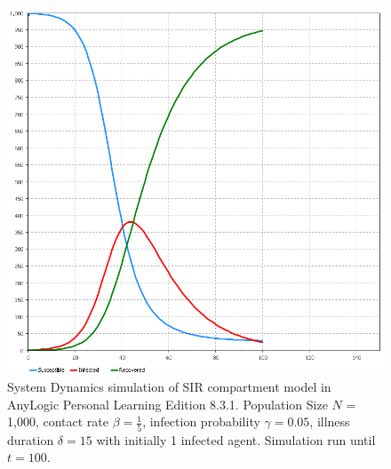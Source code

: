 \begin{figure}
	\centering
	\includegraphics[width=.4\textwidth, angle=0]{./fig/SIR_SD_1000agents_100t_ANYLOGIC.png}
	\caption{System Dynamics simulation of SIR compartment model in AnyLogic Personal Learning Edition 8.3.1. Population Size $N$ = 1,000, contact rate $\beta = \frac{1}{5}$, infection probability $\gamma = 0.05$, illness duration $\delta = 15$ with initially 1 infected agent. Simulation run until $t = 100$.}
	\label{fig:sir_sd_anylogic}
\end{figure}